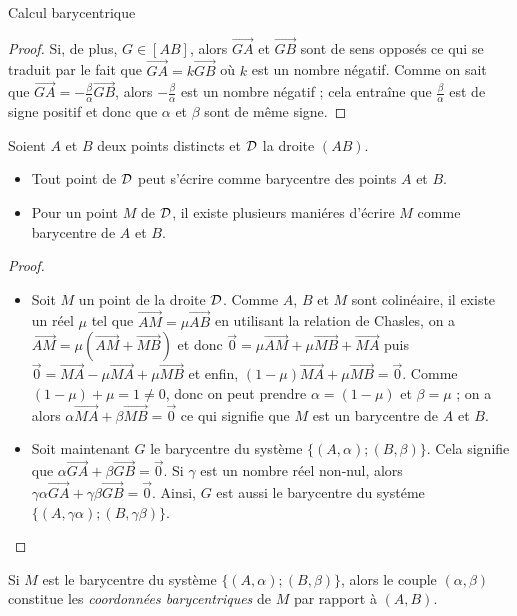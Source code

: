 \begin{chapter}{Calcul barycentrique}
\begin{prop}
\begin{proof}
		Si, de plus, $G \in [AB]$, alors $\overrightarrow{GA}$ et $\overrightarrow{GB}$ 
		sont de sens oppos\'es ce qui se traduit par le fait que 
		$\overrightarrow{GA} = k \overrightarrow{GB}$ o\`u $k$ est un nombre n\'egatif.
		Comme on sait que $\overrightarrow{GA} = - \frac{\beta}{\alpha} \overrightarrow{GB}$, 
		alors $- \frac{\beta}{\alpha}$ est un nombre n\'egatif ; cela entra\^ine que  
		$\frac{\beta}{\alpha}$ est de signe positif et donc que $\alpha$ et $\beta$ sont de m\^eme signe.
	\end{proof}
\end{prop}
%
\begin{prp}
	Soient $A$ et $B$ deux points distincts et $\mathcal{D}$ la droite $(AB)$.
	\begin{itemize} 
		\item Tout point de $\mathcal{D}$ peut s'\'ecrire comme barycentre des points $A$ et $B$.
		\item Pour un point $M$ de $\mathcal{D}$, il existe plusieurs mani\'eres d'\'ecrire $M$ comme barycentre de $A$ et $B$.
	\end{itemize}
	\begin{proof}
		\begin{itemize} 
		\item Soit $M$ un point de la droite $\mathcal{D}$.
			Comme $A$, $B$ et $M$ sont colin\'eaire, 
			il existe un r\'eel $\mu$ tel que $\overrightarrow{AM} = \mu \overrightarrow{AB}$
			en utilisant la relation de Chasles,
			on a $\overrightarrow{AM} = \mu (\overrightarrow{AM} + \overrightarrow{MB})$
			et donc $ \vec{0} = \mu \overrightarrow{AM} + \mu \overrightarrow{MB} + \overrightarrow{MA} $
			puis $\vec{0} = \overrightarrow{MA} - \mu \overrightarrow{MA} + \mu \overrightarrow{MB}$
			et enfin, $(1-\mu) \overrightarrow{MA} + \mu \overrightarrow{MB} = \vec{0}$.
			Comme $(1-\mu) + \mu = 1 \neq 0$, donc on peut prendre $\alpha = (1-\mu)$ et $\beta = \mu$ ; 
			on a alors $\alpha \overrightarrow{MA} + \beta \overrightarrow{MB} = \vec{0}$ 
			ce qui signifie que $M$ est un barycentre de $A$ et $B$.
		\item Soit maintenant $G$ le barycentre du syst\`eme $\{ (A,\alpha) ; (B,\beta) \}$.
			Cela signifie que $\alpha \overrightarrow{GA} + \beta \overrightarrow{GB} = \vec{0}$.
			Si $\gamma$ est un nombre r\'eel non-nul, 
			alors $\gamma \alpha \overrightarrow{GA} + \gamma \beta \overrightarrow{GB} = \vec{0}$.
			Ainsi, $G$ est aussi le barycentre du syst\'eme $\{ (A,\gamma \alpha) ; (B,\gamma \beta) \}$.
		\end{itemize}
	\end{proof}
\end{prp}
%
Si $M$ est le barycentre du syst\`eme $\{ (A, \alpha) ; (B, \beta) \}$, alors le couple $(\alpha,\beta)$ constitue les \emph{coordonn\'ees barycentriques} de $M$ par rapport \`a $(A,B)$.
%

\end{chapter}
